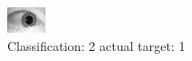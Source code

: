 \begin{figure}[h!]
\begin{center}
\includegraphics[width=0.60\columnwidth]{figures/ID1540_class_2_target_1.png}
\end{center}
\caption{ Classification: 2 actual target: 1}
\label{fig:ID1540_class_2_target_1}
\end{figure}
